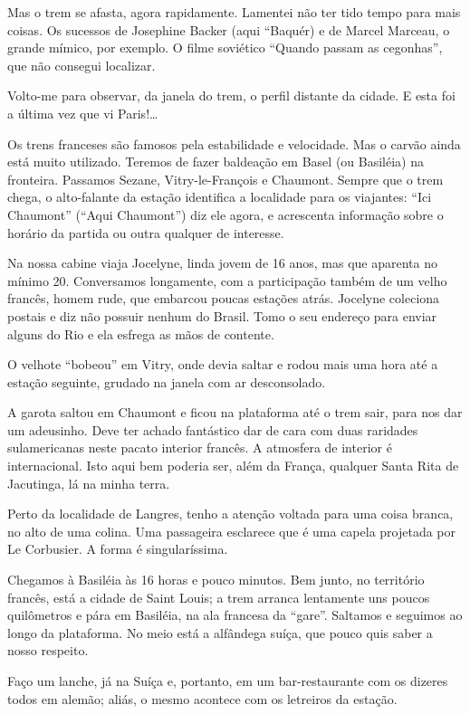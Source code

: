 Mas o trem se afasta, agora rapidamente. Lamentei não ter tido tempo para mais coisas. Os sucessos de Josephine Backer (aqui “Baquér) e de Marcel Marceau, o grande mímico, por exemplo. O filme soviético “Quando passam as cegonhas”, que não consegui localizar.

Volto-me para observar, da janela do trem, o perfil distante da cidade. E esta foi a última vez que vi Paris!\ldots

Os trens franceses são famosos pela estabilidade e velocidade. Mas o carvão ainda está muito utilizado. Teremos de fazer baldeação em Basel (ou Basiléia) na fronteira. Passamos Sezane, Vitry-le-François e Chaumont. Sempre que o trem chega, o alto-falante da estação identifica a localidade para os viajantes: “Ici Chaumont” (“Aqui Chaumont”) diz ele agora, e acrescenta informação sobre o horário da partida ou outra qualquer de interesse.

Na nossa cabine viaja Jocelyne, linda jovem de 16 anos, mas que aparenta no mínimo 20. Conversamos longamente, com a participação também de um velho francês, homem rude, que embarcou poucas estações atrás. Jocelyne coleciona postais e diz não possuir nenhum do Brasil. Tomo o seu endereço para enviar alguns do Rio e ela esfrega as mãos de contente.

O velhote “bobeou” em Vitry, onde devia saltar e rodou mais uma hora até a estação seguinte, grudado na janela com ar desconsolado.

A garota saltou em Chaumont e ficou na plataforma até o trem sair, para nos dar um adeusinho. Deve ter achado fantástico dar de cara com duas raridades sulamericanas neste pacato interior francês. A atmosfera de interior é internacional. Isto aqui bem poderia ser, além da França, qualquer Santa Rita de Jacutinga, lá na minha terra.

Perto da localidade de Langres, tenho a atenção voltada para uma coisa branca, no alto de uma colina. Uma passageira esclarece que é uma capela projetada por Le Corbusier. A forma é singularíssima.

Chegamos à Basiléia às 16 horas e pouco minutos. Bem junto, no território francês, está a cidade de Saint Louis; a trem arranca lentamente uns poucos quilômetros e pára em Basiléia, na ala francesa da “gare”. Saltamos e seguimos ao longo da plataforma. No meio está a alfândega suíça, que pouco quis saber a nosso respeito.

Faço um lanche, já na Suíça e, portanto, em um bar-restaurante com os dizeres todos em alemão; aliás, o mesmo acontece com os letreiros da estação.

